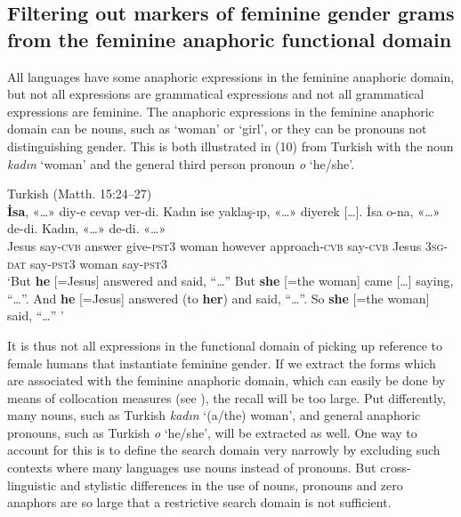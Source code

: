 \documentclass[output=collectionpaper]{langsci/langscibook}
\begin{document}
\subsection{Filtering out markers of feminine gender grams from the feminine anaphoric functional domain}
\label{sec:BW:2.4}

All languages have some anaphoric expressions in the feminine anaphoric domain, but not all expressions are grammatical expressions and not all grammatical expressions are feminine. The anaphoric expressions in the feminine anaphoric domain can be nouns, such as ‘woman’ or ‘girl’, or they can be pronouns not distinguishing gender. This is both illustrated in (10) from Turkish with the noun \textit{kadın} ‘woman’ and the general third person pronoun \textit{o} ‘he/she’.

\ea\label{ex:BW:10}
Turkish (Matth. 15:24–27)\\
\gll \textbf{İsa}, «\ldots»	diy-e	cevap	ver-di.	Kadın	ise	yaklaş-ıp, «\ldots»	diyerek [\ldots]. İsa	o-na, «\ldots»	de-di.	Kadın, «\ldots»	de-di. «\ldots»\\
Jesus	{} say-\textsc{cvb}	answer	give-\textsc{pst3}	woman	however	approach-\textsc{cvb} {} say-\textsc{cvb} {} Jesus	\textsc{3sg-dat} {}	say-\textsc{pst3}	woman {}	say-\textsc{pst3} {}\\
\glt ‘But \textbf{he} [=Jesus] answered and said, “\ldots” But \textbf{she} [=the woman] came [\ldots] saying, “\ldots”. And \textbf{he} [=Jesus] answered (to \textbf{her}) and said, “\ldots”. So \textbf{she} [=the woman] said, “\ldots” ’
\z

It is thus not all expressions in the functional domain of picking up reference to female humans that instantiate feminine gender. If we extract the forms which are associated with the feminine anaphoric domain, which can easily be done by means of collocation measures (see ), the recall will be too large. Put differently, many nouns, such as Turkish \textit{kadın} ‘(a/the) woman’, and general anaphoric pronouns, such as Turkish \textit{o} ‘he/she’, will be extracted as well. One way to account for this is to define the search domain very narrowly by excluding such contexts where many languages use nouns instead of pronouns. But cross-linguistic and stylistic differences in the use of nouns, pronouns and zero anaphors are so large that a restrictive search domain is not sufficient.
\end{document}
